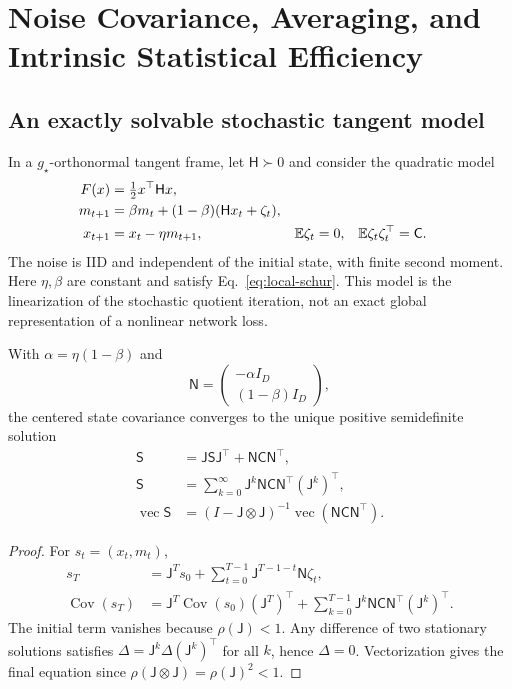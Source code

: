 \section{Noise Covariance, Averaging, and Intrinsic Statistical Efficiency}
\label{app:noise-averaging}
\subsection{An exactly solvable stochastic tangent model}
\begin{definition}
In a $g_\star$-orthonormal tangent frame, let $\mathsf H\succ0$ and
consider the quadratic model
\begin{align}
F(x)&=\tfrac12x^\top\mathsf Hx,\\
m_{t+1}&=\beta m_t+(1-\beta)(\mathsf Hx_t+\zeta_t),\\
x_{t+1}&=x_t-\eta m_{t+1},&
\mathbb E\zeta_t&=0,&
\mathbb E\zeta_t\zeta_t^\top&=\mathsf C .
\label{eq:noise-linear-model}
\end{align}
The noise is IID and independent of the initial state, with finite
second moment. Here $\eta,\beta$ are constant and satisfy
Eq.~\eqref{eq:local-schur}. This model is the linearization of the
stochastic quotient iteration, not an exact global representation
of a nonlinear network loss.
\end{definition}

\begin{theorem}
\label{thm:noise-lyapunov}
With $\alpha=\eta(1-\beta)$ and
\begin{equation}
\mathsf N=\begin{pmatrix}-\alpha I_D\\(1-\beta)I_D\end{pmatrix},
\end{equation}
the centered state covariance converges to the unique positive
semidefinite solution
\begin{align}
\mathsf S&=\mathsf J\mathsf S\mathsf J^\top+
\mathsf N\mathsf C\mathsf N^\top,\\
\mathsf S&=\sum_{k=0}^\infty
\mathsf J^k\mathsf N\mathsf C\mathsf N^\top(\mathsf J^k)^\top,\\
\operatorname{vec}\mathsf S
&=(I-\mathsf J\otimes\mathsf J)^{-1}
\operatorname{vec}(\mathsf N\mathsf C\mathsf N^\top).
\label{eq:noise-lyapunov}
\end{align}
\end{theorem}
\begin{proof}
For $s_t=(x_t,m_t)$,
\begin{align}
s_T&=\mathsf J^Ts_0+\sum_{t=0}^{T-1}
\mathsf J^{T-1-t}\mathsf N\zeta_t,\\
\operatorname{Cov}(s_T)
&=\mathsf J^T\operatorname{Cov}(s_0)(\mathsf J^T)^\top
+\sum_{k=0}^{T-1}
\mathsf J^k\mathsf N\mathsf C\mathsf N^\top(\mathsf J^k)^\top .
\end{align}
The initial term vanishes because $\rho(\mathsf J)<1$.
Any difference of two stationary solutions satisfies
$\Delta=\mathsf J^k\Delta(\mathsf J^k)^\top$ for all $k$, hence
$\Delta=0$. Vectorization gives the final equation since
$\rho(\mathsf J\otimes\mathsf J)=\rho(\mathsf J)^2<1$.
\end{proof}

